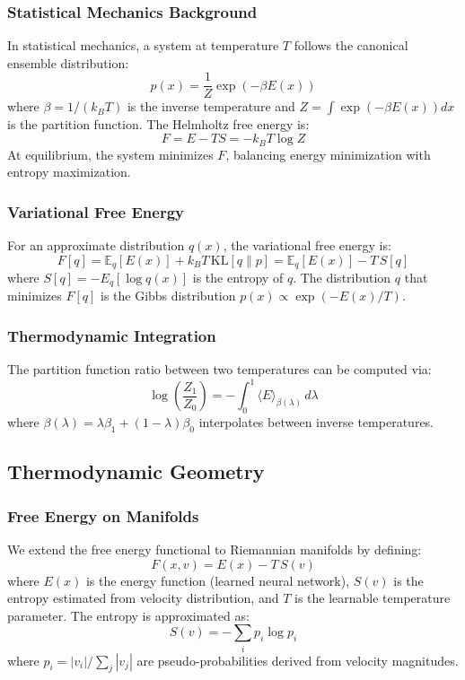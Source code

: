 \documentclass{article}
\numberwithin{equation}{section}
\begin{document}
\subsubsection{Statistical Mechanics Background}
In statistical mechanics, a system at temperature $T$ follows the canonical ensemble distribution:
\[
p(x) = \frac{1}{Z}\exp(-\beta E(x))
\]
where $\beta = 1/(k_B T)$ is the inverse temperature and $Z = \int \exp(-\beta E(x)) dx$ is the partition function.
The Helmholtz free energy is:
\[
F = E - TS = -k_B T \log Z
\]
At equilibrium, the system minimizes $F$, balancing energy minimization with entropy maximization.

\subsubsection{Variational Free Energy}
For an approximate distribution $q(x)$, the variational free energy is:
\[
F[q] = \mathbb{E}_q[E(x)] + k_B T\,\mathrm{KL}[q \| p]
     = \mathbb{E}_q[E(x)] - T\,S[q]
\]
where $S[q] = -E_q[\log q(x)]$ is the entropy of $q$.
The distribution $q$ that minimizes $F[q]$ is the Gibbs distribution $p(x) \propto \exp(-E(x)/T)$.

\subsubsection{Thermodynamic Integration}
The partition function ratio between two temperatures can be computed via:
\[
\log\!\left(\frac{Z_1}{Z_0}\right) = -\int_0^1 \langle E\rangle_{\beta(\lambda)}\,d\lambda
\]
where $\beta(\lambda) = \lambda \beta_1 + (1-\lambda)\beta_0$ interpolates between inverse temperatures.

\subsection{Thermodynamic Geometry}
\subsubsection{Free Energy on Manifolds}
We extend the free energy functional to Riemannian manifolds by defining:
\[
F(x, v) = E(x) - T\,S(v)
\]
where $E(x)$ is the energy function (learned neural network), $S(v)$ is the entropy estimated from velocity distribution, and $T$ is the learnable temperature parameter.
The entropy is approximated as:
\[
S(v) = -\sum_i p_i \log p_i
\]
where $p_i = |v_i| / \sum_j |v_j|$ are pseudo-probabilities derived from velocity magnitudes.
\end{document}
